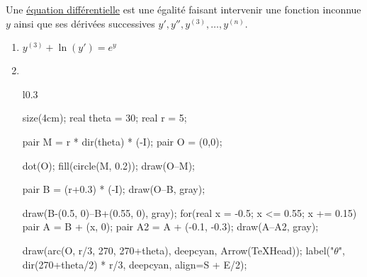 \begin{defn}
	Une \underline{équation différentielle} est une égalité faisant intervenir une fonction inconnue $y$ ainsi que ses dérivées successives $y', y'', y^{(3)}, \ldots, y^{(n)}$.
\end{defn}

\begin{exm}
	\begin{enumerate}
		\item $y^{(3)} + \ln\left( y' \right) = e^{y}$ 
		\item ~\\
			\begin{minipage}
				{\linewidth}
				\begin{wrapfigure}
					{l}{0.3\linewidth}
					\vspace{-1.5cm}
					\centering
					\begin{asy}
						size(4cm);
						real theta = 30;
						real r = 5;

						pair M = r * dir(theta) * (-I);
						pair O = (0,0);

						dot(O);
						fill(circle(M, 0.2));
						draw(O--M);

						pair B = (r+0.3) * (-I);
						draw(O--B, gray);

						draw(B-(0.5, 0)--B+(0.55, 0), gray);
						for(real x = -0.5; x <= 0.55; x += 0.15) {
							pair A = B + (x, 0);
							pair A2 = A + (-0.1, -0.3);
							draw(A--A2, gray);
						}

						draw(arc(O, r/3, 270, 270+theta), deepcyan, Arrow(TeXHead));
						label("$\theta$", dir(270+theta/2) * r/3, deepcyan, align=S + E/2);
					\end{asy}
				\end{wrapfigure}


\end{minipage}
\end{enumerate}
\end{exm}

